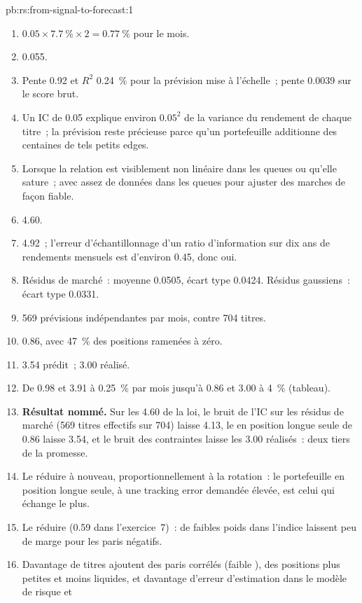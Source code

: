 \begin{solution}{pb:rs:from-signal-to-forecast:1}
\begin{enumerate}
\item $0.05 \times 7.7~\% \times 2 = 0.77~\%$ pour le mois.
\item 0.055.
\item Pente 0.92 et $R^2$ 0.24~\% pour la prévision mise à l'échelle~; pente 0.0039 sur le score brut.
\item Un IC de 0.05 explique environ $0.05^2$ de la variance du rendement de chaque titre~; la prévision reste précieuse parce qu'un portefeuille additionne des centaines de
tels petits edges.
\item Lorsque la relation est visiblement non linéaire dans les queues ou qu'elle sature~; avec assez de données dans les queues pour ajuster des marches de façon fiable.
\item 4.60.
\item 4.92~; l'erreur d'échantillonnage d'un ratio d'information sur dix ans de rendements mensuels est d'environ 0.45, donc oui.
\item Résidus de marché~: moyenne 0.0505, écart type 0.0424. Résidus gaussiens~: écart type 0.0331.
\item 569 prévisions indépendantes par mois, contre 704 titres.
\item 0.86, avec 47~\% des positions ramenées à zéro.
\item 3.54 prédit~; 3.00 réalisé.
\item De 0.98 et 3.91 à 0.25~\% par mois jusqu'à 0.86 et 3.00 à 4~\% (tableau).
\item \textbf{Résultat nommé.} Sur les 4.60 de la loi, le bruit de l'IC sur les résidus de marché (569 titres effectifs sur 704) laisse 4.13, le  en position longue seule de 0.86 laisse 3.54, et le bruit des contraintes laisse les 3.00 réalisés~: deux tiers de la promesse.
\item Le réduire à nouveau, proportionnellement à la rotation~: le portefeuille en position longue seule, à une tracking error demandée élevée, est celui qui échange le plus.
\item Le réduire (0.59 dans l'exercice~7)~: de faibles poids dans l'indice laissent peu de marge pour les paris négatifs.
\item Davantage de titres ajoutent des paris corrélés (faible ), des positions plus petites et moins liquides, et davantage d'erreur d'estimation dans le modèle de risque et

\end{enumerate}
\end{solution}
